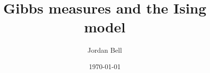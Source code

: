 \documentclass{amsart}
\begin{document}
\title{Gibbs measures and the Ising model}
\author{Jordan Bell}
\address{Department of Mathematics, University of Toronto, Toronto, Ontario, Canada}
\date{\today}
\maketitle
\end{document}
